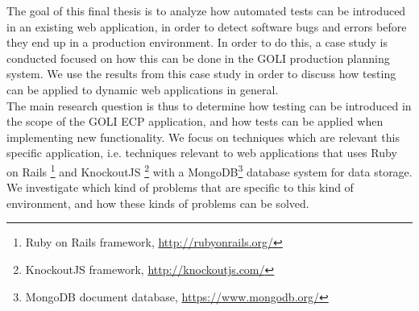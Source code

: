 
The goal of this final thesis is to analyze how automated tests can be
introduced in an existing web application, in order to detect software
bugs and errors before they end up in a production environment. In order
to do this, a case study is conducted focused on how this can be done in
the GOLI production planning system. We use the results from this case
study in order to discuss how testing can be applied to dynamic web
applications in general.\\

The main research question is thus to determine how testing can be
introduced in the scope of the GOLI ECP application, and how tests
can be applied when implementing new functionality. We focus on
techniques which are relevant this specific application, i.e.
techniques relevant to web applications that uses Ruby on Rails
\footnote{Ruby on Rails framework, \url{http://rubyonrails.org/}}
and KnockoutJS
\footnote{KnockoutJS framework, \url{http://knockoutjs.com/}} with a
MongoDB\footnote{MongoDB document database, \url{https://www.mongodb.org/}}
database system for data storage. We investigate which kind of
problems that are specific to this kind of environment, and how these
kinds of problems can be solved.\\
